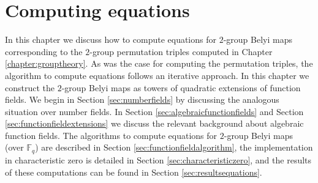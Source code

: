 \documentclass{dcthesis}
\newcommand{\FF}{\mathbb{F}}
\numberwithin{equation}{section}
\theoremstyle{definition}
\theoremstyle{remark}
\begin{document}
{\chapter{Computing equations}{\label{chapter:equations}
  In this chapter we discuss how to compute
  equations for $2$-group Belyi maps
  corresponding to the $2$-group
  permutation triples
  computed in Chapter
  \ref{chapter:grouptheory}.
  As was the case for computing the permutation
  triples,
  the algorithm to compute equations follows an
  iterative approach.
  In this chapter we
  construct the $2$-group Belyi maps
  as towers of quadratic extensions
  of function fields.
  We begin in Section
  \ref{sec:numberfields}
  by discussing the analogous situation
  over number fields.
  In Section \ref{sec:algebraicfunctionfields}
  and Section \ref{sec:functionfieldextensions}
  we discuss the relevant
  background about algebraic function fields.
  The algorithms to compute
  equations for
  $2$-group Belyi maps
  (over $\FF_q$)
  are described in Section
  \ref{sec:functionfieldalgorithm},
  the implementation in characteristic zero
  is detailed in Section
  \ref{sec:characteristiczero},
  and the results of these computations
  can be found in
  Section
  \ref{sec:resultsequations}.
}}
\end{document}
